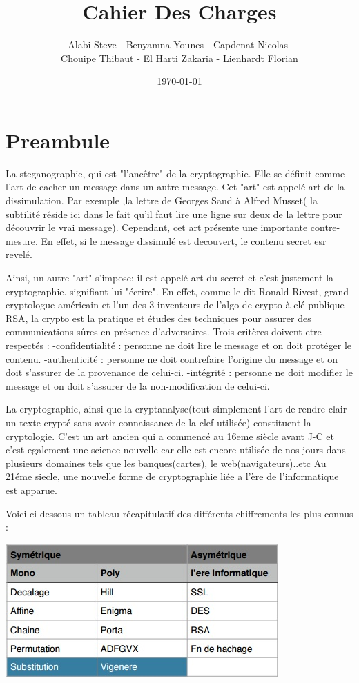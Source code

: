 \documentclass[a4]{article}
\author{Alabi Steve - Benyamna Younes - Capdenat Nicolas- \\
		Chouipe Thibaut - El Harti Zakaria - Lienhardt Florian}
\title{Cahier Des Charges}
\date{\today}
\begin{document}
\maketitle
		\section{Preambule}
				La steganographie, qui est "l'ancêtre" de la cryptographie. Elle se définit comme l'art de cacher un message dans un autre message. Cet "art"
				est appelé art de la dissimulation. 
				Par exemple ,la lettre de Georges Sand à Alfred Musset( la subtilité réside ici dans le fait qu'il faut lire une ligne sur deux de la lettre pour découvrir le vrai message).
				Cependant, cet art présente une importante contre-mesure. En effet, si le message dissimulé est decouvert, le contenu secret esr revelé.

				Ainsi, un autre "art" s'impose: il est appelé art du secret et c'est justement la cryptographie.
				signifiant lui "écrire". En effet, comme le dit Ronald Rivest, grand cryptologue américain et l'un des 3 inventeurs de l'algo
				de crypto à clé publique RSA, la crypto est la pratique et études des techniques pour assurer des communications sûres en présence d'adversaires.
				Trois critères doivent etre respectés : 
				-confidentialité : personne ne doit lire le message et on doit protéger le contenu.
				-authenticité : personne ne doit contrefaire l'origine du message et on doit s'assurer de la 							provenance de celui-ci.
				-intégrité : personne ne doit modifier le message et on doit s'assurer de la non-modification 							de celui-ci.

				La cryptographie, ainsi que la cryptanalyse(tout simplement l'art de rendre clair un texte crypté sans avoir connaissance de la clef utilisée) constituent la cryptologie.
				C'est un art ancien qui a commencé au 16eme siècle avant J-C et c'est egalement une science nouvelle car elle est encore utilisée de nos jours dans plusieurs domaines tels que les banques(cartes), le web(navigateurs)..etc
				Au 21éme siecle, une nouvelle forme de cryptographie liée a l'ère de l'informatique est apparue.
				
				Voici ci-dessous un tableau récapitulatif des différents chiffrements les plus connus :
				\\
				\begin{center}\includegraphics[scale=0.7]{Tab1.jpg}\end{center}
				
\end{document}
